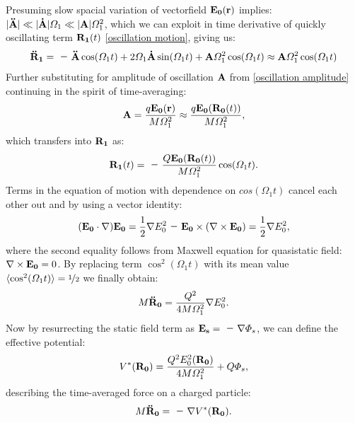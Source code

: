 Presuming slow spacial variation of vectorfield $\vb{E_0}(\vb{r})$ implies: \\ $|\vb{\ddot{A}}| \ll |\vb{\dot{A}}| \Omega_1 \ll |\vb{A}| \Omega_1^2$, which we can exploit in time derivative of quickly oscillating term $\vb{R_1}(t)$ \eqref{oscillation motion}, giving us:
\begin{equation}
	\vb{\ddot{R}_1} = \minus \vb{\ddot{A}} \cos(\Omega_1 t) + 2 \Omega_1 \vb{\dot{A}} \sin(\Omega_1 t) + \vb{A} \Omega_1^2 \cos(\Omega_1 t) \approx \vb{A} \Omega_1^2 \cos(\Omega_1 t)
\end{equation}
Further substituting for amplitude of oscillation $\vb{A}$ from \eqref{oscillation amplitude} continuing in the spirit of time-averaging:
\begin{equation}
	\vb{A} = \frac{q \vb{E_0}(\vb{r})}{M \Omega_1^2} \approx \frac{q \vb{E_0}(\vb{R_0}(t))}{M \Omega_1^2},
\end{equation}
which transfers into $\vb{R_1}$ as:
\begin{equation}
	\label{oscillation motion approx}
	\vb{R_1}(t) = \minus \frac{Q \vb{E_0}(\vb{R_0}(t))}{M \Omega_1^2} \cos(\Omega_1 t). 
\end{equation}
Terms in the equation of motion with dependence on $cos(\Omega_1 t)$ cancel each other out and by using a vector identity:
\begin{equation}
	\label{vector identity}
	(\vb{E_0} \cdot \nabla) \vb{E_0} = \frac{1}{2} \nabla E_0^2 \minus \vb{E_0} \times (\nabla \times \vb{E_0}) = \frac{1}{2} \nabla E_0^2,
\end{equation}
where the second equality follows from Maxwell equation for quasistatic field: \\ $\nabla \times \vb{E_0} = 0$. By replacing term $\cos^2(\Omega_1 t)$ with its mean value $\langle\cos^2(\Omega_1 t)\rangle = \nicefrac{1}{2}$ we finally obtain:
\begin{equation}
	M \vb{\ddot{R}_0} = \frac{Q^2}{4 M \Omega_1^2} \nabla E_0^2.
\end{equation}
Now by resurrecting the static field term as $\vb{E_s} = \minus \nabla \Phi_s$, we can define the effective potential:
\begin{equation}
	\label{effective potential}
	V^*(\vb{R_0}) = \frac{Q^2 E_0^2(\vb{R_0})}{4 M \Omega_1^2} + Q \Phi_s, 
\end{equation}
describing the time-averaged force on a charged particle:
\begin{equation}
	\label{effective equation of motion}
	M \vb{\ddot{R}_0} = \minus \nabla V^*(\vb{R_0}). 
\end{equation}
